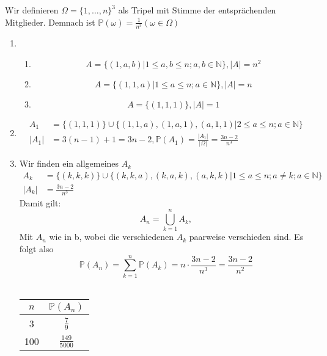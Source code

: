 \documentclass{article}
\newcommand{\N}{\mathbb{N}}
\renewcommand{\P}{\mathbb{P}}
\begin{document}
    \subsection{}
    Wir definieren $\Omega=\{1,\hdots,n\}^3$ als Tripel mit
    Stimme der entsprächenden Mitglieder.
    Demnach ist $\P(\omega)=\frac{1}{n^3} (\omega\in\Omega)$
    \begin{enumerate}[a]
        \item
            \begin{enumerate}[i]
                \item
                    \begin{equation*}
                        A=\{(1,a,b)|1\leq a,b\leq n; a,b\in\N\},
                        |A|=n^2
                    \end{equation*}
                \item
                    \begin{equation*}
                        A=\{(1,1,a)|1\leq a\leq n; a\in\N\},
                        |A|=n
                    \end{equation*}
                \item
                    \begin{equation*}
                        A=\{(1,1,1)\},
                        |A|=1
                    \end{equation*}
            \end{enumerate}
        \item
            \begin{align*}
                A_1&=\{(1,1,1)\}\cup\{(1,1,a),(1,a,1),(a,1,1)
                |2\leq a\leq n;a\in\N\}\\
                |A_1|&=3(n-1)+1=3n-2,\P(A_1)=\frac{|A_1|}{|\Omega|}
                =\frac{3n-2}{n^3}
            \end{align*}
        \item
            Wir finden ein allgemeines $A_k$
            \begin{align*}
                A_k&=\{(k,k,k)\}\cup\{(k,k,a),(k,a,k),(a,k,k)
                |1\leq a\leq n; a\neq k;a\in\N\}\\
                |A_k|&=\frac{3n-2}{n^3}
            \end{align*}
            Damit gilt:
            \begin{equation*}
                A_n=\bigcup_{k=1}^{n}A_k,
            \end{equation*}
            Mit $A_n$ wie in b,
            wobei die verschiedenen $A_k$ paarweise
            verschieden sind. Es folgt also
            \begin{equation*}
                \P(A_n)=\sum_{k=1}^{n}\P(A_k)
                =n\cdot\frac{3n-2}{n^3}=\frac{3n-2}{n^2}
            \end{equation*}\\
            \begin{tabular}{c|c}
                $n$&$\P(A_n)$\\
                \hline
                3&$\frac{7}{9}$\\
                100&$\frac{149}{5000}$
            \end{tabular}
    \end{enumerate}
\end{document}
